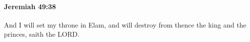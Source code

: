 
		\paragraph{Jeremiah 49:38} %
			\label{JEREMIAH-49-38}

			And I will set my throne in Elam, and will destroy from thence the king and the princes, saith the LORD.


